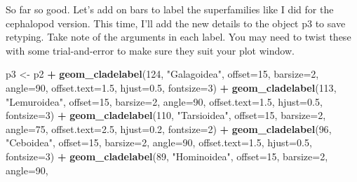 \documentclass[
]{book}
\newenvironment{Shaded}{\begin{snugshade}}{\end{snugshade}}
\newcommand{\DataTypeTok}[1]{\textcolor[rgb]{0.13,0.29,0.53}{#1}}
\newcommand{\DecValTok}[1]{\textcolor[rgb]{0.00,0.00,0.81}{#1}}
\newcommand{\FloatTok}[1]{\textcolor[rgb]{0.00,0.00,0.81}{#1}}
\newcommand{\KeywordTok}[1]{\textcolor[rgb]{0.13,0.29,0.53}{\textbf{#1}}}
\newcommand{\NormalTok}[1]{#1}
\newcommand{\OperatorTok}[1]{\textcolor[rgb]{0.81,0.36,0.00}{\textbf{#1}}}
\newcommand{\StringTok}[1]{\textcolor[rgb]{0.31,0.60,0.02}{#1}}
\begin{document}
So far so good. Let's add on bars to label the superfamilies like I did for the cephalopod version. This time, I'll add the new details to the object p3 to save retyping. Take note of the arguments in each label. You may need to twist these with some trial-and-error to make sure they suit your plot window.

\begin{Shaded}
\begin{Highlighting}[]
\NormalTok{p3 \textless{}{-}}\StringTok{ }\NormalTok{p2 }\OperatorTok{+}
\StringTok{  }\KeywordTok{geom\_cladelabel}\NormalTok{(}\DecValTok{124}\NormalTok{, }\StringTok{"Galagoidea"}\NormalTok{, }\DataTypeTok{offset=}\DecValTok{15}\NormalTok{, }\DataTypeTok{barsize=}\DecValTok{2}\NormalTok{, }\DataTypeTok{angle=}\DecValTok{90}\NormalTok{,}
                  \DataTypeTok{offset.text=}\FloatTok{1.5}\NormalTok{, }\DataTypeTok{hjust=}\FloatTok{0.5}\NormalTok{, }\DataTypeTok{fontsize=}\DecValTok{3}\NormalTok{) }\OperatorTok{+}\StringTok{ }
\StringTok{  }\KeywordTok{geom\_cladelabel}\NormalTok{(}\DecValTok{113}\NormalTok{, }\StringTok{"Lemuroidea"}\NormalTok{, }\DataTypeTok{offset=}\DecValTok{15}\NormalTok{, }\DataTypeTok{barsize=}\DecValTok{2}\NormalTok{, }\DataTypeTok{angle=}\DecValTok{90}\NormalTok{,}
                  \DataTypeTok{offset.text=}\FloatTok{1.5}\NormalTok{, }\DataTypeTok{hjust=}\FloatTok{0.5}\NormalTok{, }\DataTypeTok{fontsize=}\DecValTok{3}\NormalTok{) }\OperatorTok{+}
\StringTok{  }\KeywordTok{geom\_cladelabel}\NormalTok{(}\DecValTok{110}\NormalTok{, }\StringTok{"Tarsioidea"}\NormalTok{, }\DataTypeTok{offset=}\DecValTok{15}\NormalTok{, }\DataTypeTok{barsize=}\DecValTok{2}\NormalTok{, }\DataTypeTok{angle=}\DecValTok{75}\NormalTok{,}
                  \DataTypeTok{offset.text=}\FloatTok{2.5}\NormalTok{, }\DataTypeTok{hjust=}\FloatTok{0.2}\NormalTok{, }\DataTypeTok{fontsize=}\DecValTok{2}\NormalTok{) }\OperatorTok{+}
\StringTok{  }\KeywordTok{geom\_cladelabel}\NormalTok{(}\DecValTok{96}\NormalTok{, }\StringTok{"Ceboidea"}\NormalTok{, }\DataTypeTok{offset=}\DecValTok{15}\NormalTok{, }\DataTypeTok{barsize=}\DecValTok{2}\NormalTok{, }\DataTypeTok{angle=}\DecValTok{90}\NormalTok{,}
                  \DataTypeTok{offset.text=}\FloatTok{1.5}\NormalTok{, }\DataTypeTok{hjust=}\FloatTok{0.5}\NormalTok{, }\DataTypeTok{fontsize=}\DecValTok{3}\NormalTok{) }\OperatorTok{+}
\StringTok{  }\KeywordTok{geom\_cladelabel}\NormalTok{(}\DecValTok{89}\NormalTok{, }\StringTok{"Hominoidea"}\NormalTok{, }\DataTypeTok{offset=}\DecValTok{15}\NormalTok{, }\DataTypeTok{barsize=}\DecValTok{2}\NormalTok{, }\DataTypeTok{angle=}\DecValTok{90}\NormalTok{,}

\end{Highlighting}
\end{Shaded}
\end{document}

